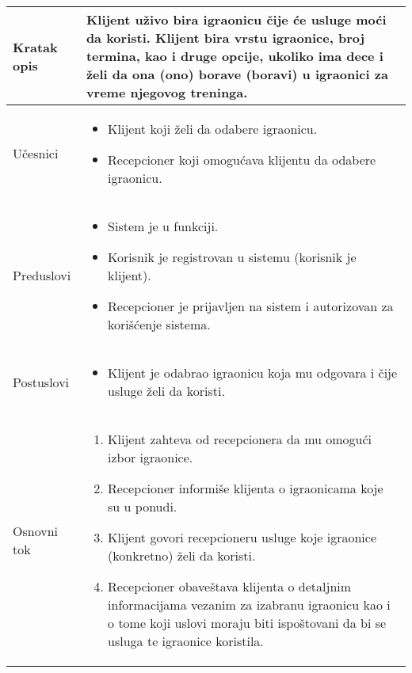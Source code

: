 \documentclass[../../main.tex]{subfiles}
\begin{document}
\begin{longtable}{| p{} | p{} |} 
\hline
    Kratak opis & Klijent uživo bira igraonicu čije će usluge moći da koristi. Klijent bira vrstu igraonice, broj termina, kao i druge opcije, ukoliko ima dece i želi da ona (ono) borave (boravi) u igraonici za vreme njegovog treninga. \\ 
\hline
    Učesnici &
    \begin{itemize}
        \item Klijent koji želi da odabere igraonicu.
        \item Recepcioner koji omogućava klijentu da odabere igraonicu.
    \end{itemize}\\
\hline
   Preduslovi &
    \begin{itemize}
        \item Sistem je u funkciji.
        \item Korisnik je registrovan u sistemu (korisnik je klijent).
        \item Recepcioner je prijavljen na sistem i autorizovan za korišćenje sistema.
    \end{itemize}\\
\hline  
    Postuslovi & 
    \begin{itemize}
         \item Klijent je odabrao igraonicu koja mu odgovara i čije usluge želi da koristi.
    \end{itemize} \\
\hline
    Osnovni tok & 
    \begin{enumerate}
        \item Klijent zahteva od recepcionera da mu omogući izbor igraonice.
        \item Recepcioner informiše klijenta o igraonicama koje su u ponudi.
        \item Klijent govori recepcioneru usluge koje igraonice (konkretno) želi da koristi.
        \item Recepcioner obaveštava klijenta o detaljnim informacijama vezanim za izabranu igraonicu kao i o tome koji uslovi moraju biti ispoštovani da bi se usluga te igraonice koristila.

\end{enumerate}
\end{longtable}
\end{document}
